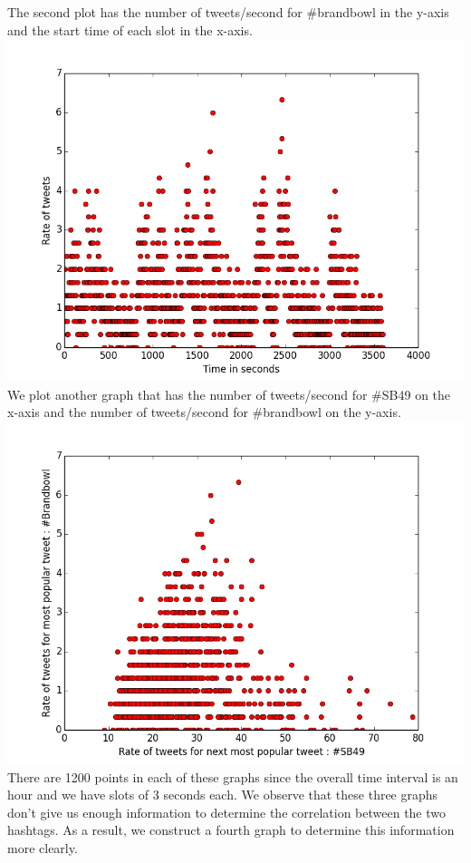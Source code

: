 \documentclass{article}
\begin{document}
The second plot has the number of tweets/second for \#brandbowl
in the y-axis and the start time of each slot in the x-axis.\\
\includegraphics[scale=0.5]{5b}\\
We plot another graph
that has the number of tweets/second for \#SB49 on the x-axis and the number of tweets/second for \#brandbowl on the y-axis.\\

\includegraphics[scale=0.5]{5c}\\
There are 1200 points in 
each of these graphs since the overall time interval is an
hour and we have slots of 3 seconds each. 
We observe that these three graphs 
don't give us enough information to determine the correlation between the two hashtags. As a result, we construct 
a fourth graph to determine this information more clearly.\\
\end{document}
